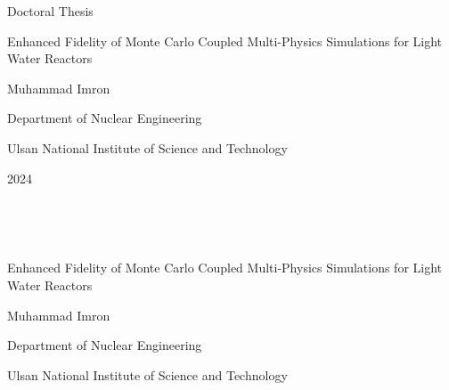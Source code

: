 \documentclass[11pt,a4paper,onecolumn,oneside]{report}
\begin{document}


\begin{center}
\LARGE Doctoral Thesis

\vspace{3cm}
\huge Enhanced Fidelity of Monte Carlo Coupled Multi-Physics Simulations for Light Water Reactors

\vfill

\LARGE Muhammad Imron

\vspace{2cm}

\LARGE Department of Nuclear Engineering 

\vspace{2cm}

\LARGE Ulsan National Institute of Science and Technology
\vspace{2cm}

\LARGE 2024

\end{center}
\thispagestyle{empty}
\clearpage

\begin{center}
\hbox{ }

\hbox{ }

\huge Enhanced Fidelity of Monte Carlo Coupled Multi-Physics Simulations for Light Water Reactors 

\vspace{5cm}

\LARGE Muhammad Imron

\vspace{6cm}

\LARGE Department of Nuclear Engineering 

\vspace{2cm}

\LARGE Ulsan National Institute of Science and Technology

\end{center}
\thispagestyle{empty}
\clearpage


%
\end{document}
